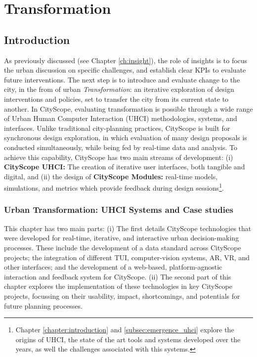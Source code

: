 \chapter{Transformation}\label{ch:transformation}
{
    \section{Introduction}
     {
      As previously discussed (see Chapter \eqref{ch:insight}), the role of insights is to focus the urban discussion on specific challenges, and establish clear KPIs to evaluate future interventions. The next step is to introduce and evaluate change to the city, in the from of urban \textit{Transformation}: an iterative exploration of design interventions and policies, set to transfer the city from its current state to another. In CityScope, evaluating transformation is possible through a wide range of Urban Human Computer Interaction (UHCI) methodologies, systems, and interfaces. Unlike traditional city-planning practices, CityScope is built for synchronous design exploration, in which evaluation of many design proposals is conducted simultaneously, while being fed by real-time data and analysis. To achieve this capability, CityScope has two main streams of development: (i) \textbf{CityScope UHCI:} The creation of iterative user interfaces, both tangible and digital, and (ii) the design of \textbf{CityScope Modules:} real-time models, simulations, and metrics which provide feedback during design sessions\footnote{Chapter \eqref{chapter:introduction} and \eqref{subsec:emergence_uhci} explore the origins of UHCI, the state of the art tools and systems developed over the years, as well the challenges associated with this systems.}.


      \subsection{Urban Transformation: UHCI Systems and Case studies}
      {
          This chapter has two main parts: (i) The first details CityScope technologies that were developed for real-time, iterative, and interactive urban  decision-making processes. These include the development of a data standard across CityScope projects; the integration of different TUI, computer-vision systems, AR, VR, and other interfaces; and the development of a web-based, platform-agnostic interaction and feedback system for CityScope. (ii) The second part of this chapter explores the implementation of these technologies in key CityScope projects, focussing on their usability, impact, shortcomings, and potentials for future planning processes.
      }
     }

}
